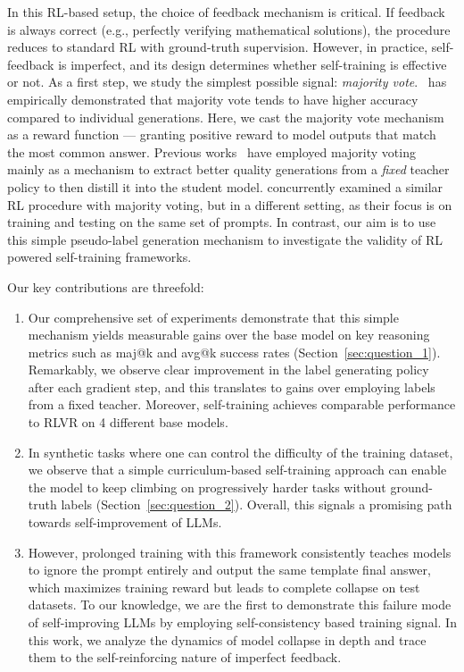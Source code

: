 In this RL-based setup, the choice of feedback mechanism is critical. If feedback is always correct (e.g., perfectly verifying mathematical solutions), the procedure reduces to standard RL with ground-truth supervision. However, in practice, self-feedback is imperfect, and its design determines whether self-training is effective or not. As a first step, we study the simplest possible signal: \emph{majority vote}.~\citet{wang2023selfconsistency} has empirically demonstrated that majority vote tends to have higher accuracy compared to individual generations. Here, we cast the majority vote mechanism as a reward function --- granting positive reward to model outputs that match the most common answer.
Previous works~\citep{huang-etal-2023-large,prasad2024selfconsistencypreferenceoptimization} have employed majority voting mainly as a mechanism to extract better quality generations from a \emph{fixed} teacher policy to then distill it into the student model. 
\citet{zuo2025ttrl} concurrently  examined a similar RL procedure with majority voting, but in a different setting, as their focus is on training and testing on the same set of prompts. In contrast, our aim is to use this simple pseudo-label generation mechanism to investigate the validity of RL powered self-training frameworks. 

Our key contributions are threefold:
\begin{enumerate}[label=\textbf{(\arabic*)}]
    \item Our comprehensive set of experiments demonstrate that this simple mechanism yields measurable gains over the base model on key reasoning metrics such as maj@k and avg@k success rates (Section~\ref{sec:question_1}). Remarkably, we observe clear improvement in the label generating policy after each gradient step, and this translates to gains over employing labels from a fixed teacher. Moreover, self-training achieves comparable performance to RLVR on 4 different base models.

    \item In synthetic tasks where one can control the difficulty of the training dataset, we observe that a simple curriculum-based self-training approach can enable the model to keep climbing on progressively harder tasks without ground-truth labels (Section~\ref{sec:question_2}). Overall, this signals a promising path towards self-improvement of LLMs.

    \item However, prolonged training with this framework consistently teaches models to ignore the prompt entirely and output the same template final answer, which maximizes training reward but leads to complete collapse on test datasets. To our knowledge, we are the first to demonstrate this failure mode of self-improving LLMs by employing self-consistency based training signal. In this work, we analyze the dynamics of model collapse in depth and trace them to the self-reinforcing nature of imperfect feedback.
\end{enumerate}

